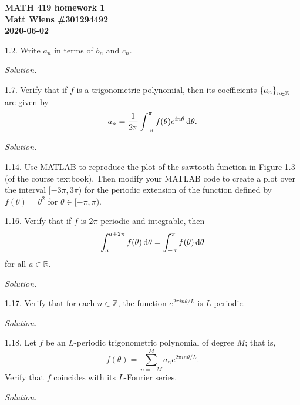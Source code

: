 \documentclass{article}
\newcommand{\R}{\mathbb{R}}
\newcommand{\Z}{\mathbb{Z}}
\begin{document}
\textbf{MATH 419 homework 1} \\
\textbf{Matt Wiens \#301294492} \\
\textbf{2020-06-02}

1.2. Write $a_n$ in terms of $b_n$ and $c_n$.

\textit{Solution.}

\newpage

1.7. Verify that if $f$ is a trigonometric polynomial, then its
coefficients $\cbr{a_n}_{n \in \Z}$ are given by
%
\begin{equation*}
    a_n = \frac{1}{2 \pi} \int_{-\pi}^\pi f(\theta) e^{i n \theta} \dif \theta
    .
\end{equation*}

\textit{Solution.}

\newpage

1.14. Use MATLAB to reproduce the plot of the sawtooth function in
  Figure 1.3 (of the course textbook). Then modify your MATLAB code to
  create a plot over the interval $[-3 \pi, 3 \pi)$ for the periodic
  extension of the function defined by $f(\theta) = \theta^2$ for
  $\theta \in [-\pi, \pi)$.

\newpage

1.16. Verify that if $f$ is $2\pi$-periodic and integrable, then
%
\begin{equation*}
    \int_a^{a + 2 \pi} f(\theta) \dif \theta = \int_{-\pi}^\pi f(\theta) \dif \theta
\end{equation*}
%
for all $a \in \R$.

\textit{Solution.}

\newpage

1.17. Verify that for each $n \in \Z$, the function
  $e^{2 \pi i n \theta / L}$ is $L$-periodic.

\textit{Solution.}

\newpage

1.18. Let $f$ be an $L$-periodic trigonometric polynomial of degree $M$;
  that is,
%
\begin{equation*}
    f(\theta) = \sum_{n = - M}^M a_n e^{2 \pi i n \theta / L}
    .
\end{equation*}
%
Verify that $f$ coincides with its $L$-Fourier series.

\textit{Solution.}
\end{document}
